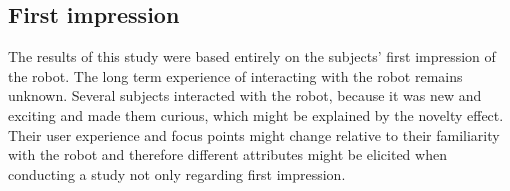 \subsection{First impression}
%
The results of this study were based entirely on the subjects' first impression of the robot. The long term experience of interacting with the robot remains unknown. Several subjects interacted with the robot, because it was new and exciting and made them curious, which might be explained by the novelty effect. Their user experience and focus points might change relative to their familiarity with the robot and therefore different attributes might be elicited when conducting a study not only regarding first impression.
